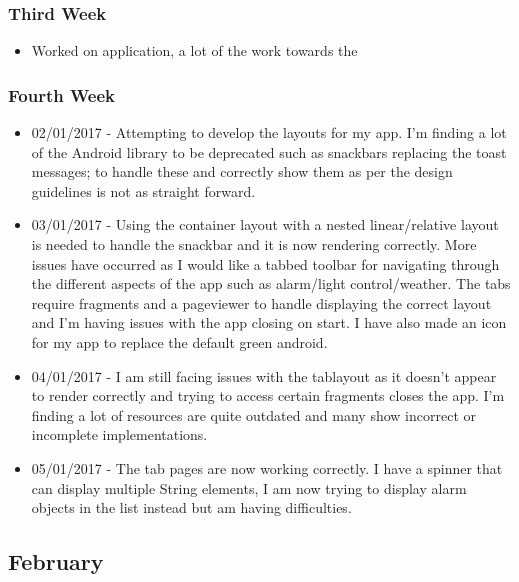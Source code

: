 \subsubsection*{Third Week}\label{third-week-2}

\begin{itemize}
\tightlist
\item
  Worked on application, a lot of the work towards the
\end{itemize}

\subsubsection*{Fourth Week}\label{fourth-week-2}

\begin{itemize}
\tightlist
\item
  02/01/2017 - Attempting to develop the layouts for my app. I'm finding
  a lot of the Android library to be deprecated such as snackbars
  replacing the toast messages; to handle these and correctly show them
  as per the design guidelines is not as straight forward.
\item
  03/01/2017 - Using the container layout with a nested linear/relative
  layout is needed to handle the snackbar and it is now rendering
  correctly. More issues have occurred as I would like a tabbed toolbar
  for navigating through the different aspects of the app such as
  alarm/light control/weather. The tabs require fragments and a
  pageviewer to handle displaying the correct layout and I'm having
  issues with the app closing on start. I have also made an icon for my
  app to replace the default green android.
\item
  04/01/2017 - I am still facing issues with the tablayout as it doesn't
  appear to render correctly and trying to access certain fragments
  closes the app. I'm finding a lot of resources are quite outdated and
  many show incorrect or incomplete implementations.
\item
  05/01/2017 - The tab pages are now working correctly. I have a spinner
  that can display multiple String elements, I am now trying to display
  alarm objects in the list instead but am having difficulties.
\end{itemize}

\subsection{February}\label{february}

